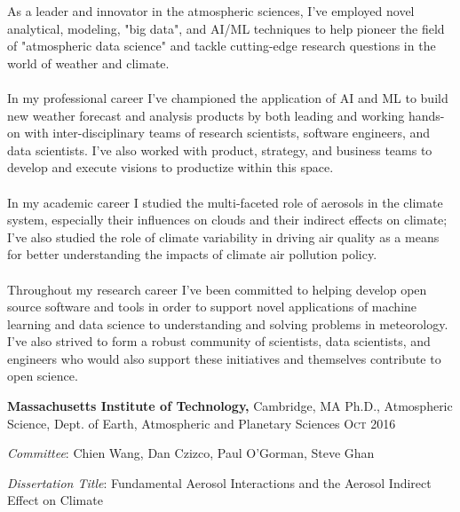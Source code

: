 \documentclass[11pt,letterpaper]{article}
\newenvironment{itemize*}%
{\begin{itemize}%
  \setlength{\itemsep}{0pt}}%
{\end{itemize}}
\newcommand{\mhead}[1]{\leavevmode\marginpar{\sffamily\footnotesize #1}}
\newcommand{\rdate}[1]{{\addfontfeature{Numbers=OldStyle} \hfill #1}}
\begin{document}
As a leader and innovator in the atmospheric sciences, I've employed novel
analytical, modeling, "big data", and AI/ML techniques to help
pioneer the field of "atmospheric data science" and tackle cutting-edge
research questions in the world of weather and climate. \\ \\
In my professional career I've championed the application of AI and ML to build
new weather forecast and analysis products by both leading and working hands-on 
with inter-disciplinary teams of research scientists, software engineers, and
data scientists. I've also worked with product, strategy, and business teams to
develop and execute visions to productize within this space. \\ \\
In my academic career I studied the multi-faceted role of aerosols in the 
climate system, especially their influences on clouds and their indirect effects
on climate; I've also studied the role of climate variability in driving air
quality as a means for better understanding the impacts of climate air pollution 
policy. \\ \\
Throughout my research career I've been committed to helping develop open 
source software and tools in order to support novel applications of machine
learning and data science to understanding and solving problems in meteorology.
I've also strived to form a robust community of scientists, data scientists,
and engineers who would also support these initiatives and themselves 
contribute to open science.


\bigskip
\mhead{Education}%
\textbf{Massachusetts Institute of Technology,} Cambridge, MA \newline
Ph.D., Atmospheric Science, Dept. of Earth, Atmospheric and Planetary Sciences \rdate{\textsc{Oct} 2016}
{\small
 \begin{itemize*}
  \item \emph{Committee}: Chien Wang, Dan Czizco, Paul O'Gorman, Steve Ghan
  \item \emph{Dissertation Title}: Fundamental Aerosol Interactions and the Aerosol Indirect Effect on Climate
%
 \end{itemize*}
}
\end{document}
